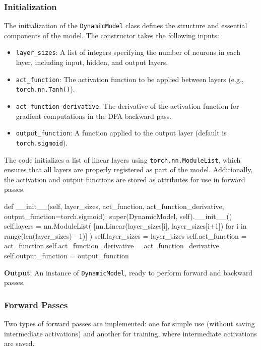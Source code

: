 \documentclass[english]{article}
\begin{document}
\subsubsection{Initialization}

The initialization of the \texttt{DynamicModel} class defines the structure and essential components of the model. The constructor takes the following inputs:

\begin{itemize}
    \item \texttt{layer\_sizes}: A list of integers specifying the number of neurons in each layer, including input, hidden, and output layers.
    \item \texttt{act\_function}: The activation function to be applied between layers (e.g., \texttt{torch.nn.Tanh()}).
    \item \texttt{act\_function\_derivative}: The derivative of the activation function for gradient computations in the DFA backward pass.
    \item \texttt{output\_function}: A function applied to the output layer (default is \texttt{torch.sigmoid}).
\end{itemize}

The code initializes a list of linear layers using \texttt{torch.nn.ModuleList}, which ensures that all layers are properly registered as part of the model. Additionally, the activation and output functions are stored as attributes for use in forward passes.

\begin{python}
def __init__(self, layer_sizes, act_function, act_function_derivative, output_function=torch.sigmoid):
    super(DynamicModel, self).__init__()
    self.layers = nn.ModuleList(
        [nn.Linear(layer_sizes[i], layer_sizes[i+1]) for i in range(len(layer_sizes) - 1)]
    )
    self.layer_sizes = layer_sizes
    self.act_function = act_function
    self.act_function_derivative = act_function_derivative
    self.output_function = output_function
\end{python}

\textbf{Output}: An instance of \texttt{DynamicModel}, ready to perform forward and backward passes.

\subsubsection{Forward Passes}

Two types of forward passes are implemented: one for simple use (without saving intermediate activations) and another for training, where intermediate activations are saved.
\end{document}
